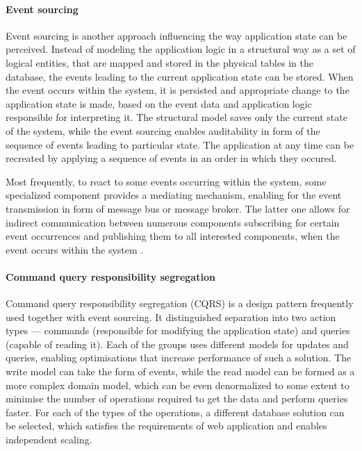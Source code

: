 \paragraph{Event sourcing} \label{chapter:event-driven-sourcing}

Event sourcing is another approach influencing the way application state can be perceived. Instead of modeling the application logic in a structural way as a set of logical entities, that are mapped and stored in the physical tables in the database, the events leading to the current application state can be stored. When the event occurs within the system, it is persisted and appropriate change to the application state is made, based on the event data and application logic responsible for interpreting it. The structural model saves only the current state of the system, while the event sourcing enables auditability in form of the sequence of events leading to particular state. The application at any time can be recreated by applying a sequence of events in an order in which they occured.

Most frequently, to react to some events occurring within the system, some specialized component provides a mediating mechanism, enabling for the event transmission in form of message bus or message broker. The latter one allows for indirect communication between numerous components subscribing for certain event occurrences and publishing them to all interested components, when the event occurs within the system \cite{MicroservicesArchitecture}.

\paragraph{Command query responsibility segregation}

Command query responsibility segregation (CQRS) is a design pattern frequently used together with event sourcing. It distinguished separation into two action types --- commands (responsible for modifying the application state) and queries (capable of reading it). Each of the groups uses different models for updates and queries, enabling optimisations that increase performance of such a solution. The write model can take the form of events, while the read model can be formed as a more complex domain model, which can be even denormalized to some extent to minimise the number of operations required to get the data and perform queries faster. For each of the types of the operations, a different database solution can be selected, which satisfies the requirements of web application and enables independent scaling. 

